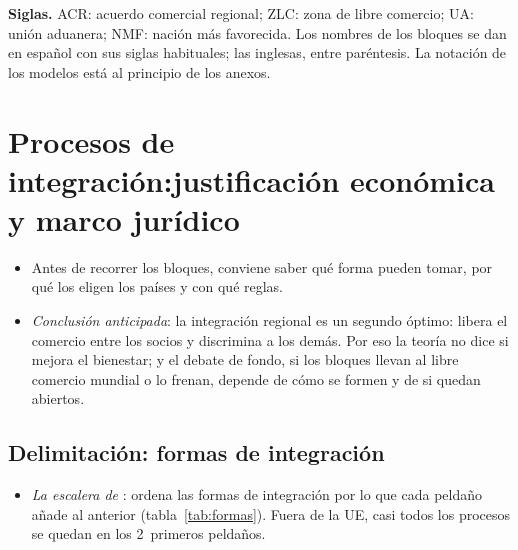 \documentclass[11pt]{article}
\begin{document}
\begin{anotaciones}
\textbf{Siglas.} ACR: acuerdo comercial regional; ZLC: zona de libre comercio; UA: unión aduanera; NMF: nación más favorecida. Los nombres de los bloques se dan en español con sus siglas habituales; las inglesas, entre paréntesis. La notación de los modelos está al principio de los anexos.
\end{anotaciones}

\section{Procesos de integración:\cortetitulo justificación económica y marco jurídico}\label{sec:justificacion}

\begin{itemize}
\item Antes de recorrer los bloques, conviene saber qué forma pueden tomar, por qué los eligen los países y con qué reglas.
\item \emph{Conclusión anticipada}: la integración regional es un segundo óptimo: libera el comercio entre los socios y discrimina a los demás. Por eso la teoría no dice si mejora el bienestar; y el debate de fondo, si los bloques llevan al libre comercio mundial o lo frenan, depende de cómo se formen y de si quedan abiertos.
\end{itemize}

\subsection{Delimitación: formas de integración}\label{sec:delimitacion}

\begin{itemize}
\item \emph{La escalera de }: \textcite{Balassa1961Theory} ordena las formas de integración por lo que cada peldaño añade al anterior (tabla~\ref{tab:formas}). Fuera de la UE, casi todos los procesos se quedan en los 2~primeros peldaños.
\end{itemize}
\end{document}

